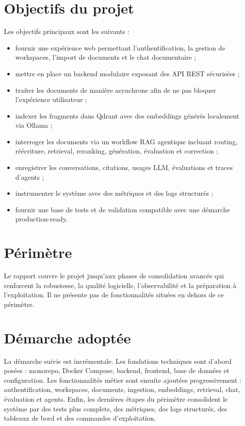\documentclass[12pt,a4paper,oneside]{report}
\begin{document}
\section{Objectifs du projet}
Les objectifs principaux sont les suivants :
\begin{itemize}
  \item fournir une expérience web permettant l'authentification, la gestion de workspaces, l'import de documents et le chat documentaire ;
  \item mettre en place un backend modulaire exposant des API REST sécurisées ;
  \item traiter les documents de manière asynchrone afin de ne pas bloquer l'expérience utilisateur ;
  \item indexer les fragments dans Qdrant avec des embeddings générés localement via Ollama ;
  \item interroger les documents via un workflow RAG agentique incluant routing, réécriture, retrieval, reranking, génération, évaluation et correction ;
  \item enregistrer les conversations, citations, usages LLM, évaluations et traces d'agents ;
  \item instrumenter le système avec des métriques et des logs structurés ;
  \item fournir une base de tests et de validation compatible avec une démarche production-ready.
\end{itemize}

\section{Périmètre}
Le rapport couvre le projet jusqu'aux phases de consolidation avancée qui renforcent la robustesse, la qualité logicielle, l'observabilité et la préparation à l'exploitation. Il ne présente pas de fonctionnalités situées en dehors de ce périmètre.

\section{Démarche adoptée}
La démarche suivie est incrémentale. Les fondations techniques sont d'abord posées : monorepo, Docker Compose, backend, frontend, base de données et configuration. Les fonctionnalités métier sont ensuite ajoutées progressivement : authentification, workspaces, documents, ingestion, embeddings, retrieval, chat, évaluation et agents. Enfin, les dernières étapes du périmètre consolident le système par des tests plus complets, des métriques, des logs structurés, des tableaux de bord et des commandes d'exploitation.
\end{document}
